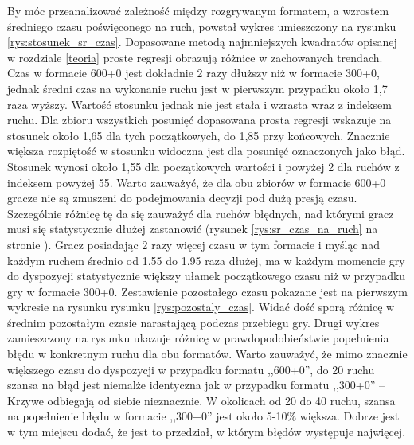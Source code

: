 \documentclass[inzynierska]{pwr_wmat_praca_dyplomowa}
\theoremstyle{plain}
\numberwithin{theorem}{chapter}
\theoremstyle{definition}
\numberwithin{theorem}{chapter}
\begin{document}
By móc przeanalizować zależność między rozgrywanym formatem, a wzrostem średniego czasu poświęconego na ruch, powstał wykres umieszczony na rysunku \ref{rys:stosunek_sr_czas}. Dopasowane metodą najmniejszych kwadratów opisanej w rozdziale \ref{teoria} proste regresji obrazują różnice w zachowanych trendach. Czas w formacie 600+0 jest dokładnie 2 razy dłuższy niż w formacie 300+0, jednak średni czas na wykonanie ruchu jest w pierwszym przypadku około 1,7 raza wyższy. Wartość stosunku jednak nie jest stała i wzrasta wraz z indeksem ruchu. Dla zbioru wszystkich posunięć dopasowana prosta regresji wskazuje na stosunek około 1,65 dla tych początkowych, do 1,85 przy końcowych. Znacznie większa rozpiętość w stosunku widoczna jest dla posunięć oznaczonych jako błąd. Stosunek wynosi około 1,55 dla początkowych wartości i powyżej 2 dla ruchów z indeksem powyżej 55. Warto zauważyć, że dla obu zbiorów w formacie 600+0 gracze nie są zmuszeni do podejmowania decyzji pod dużą presją czasu. Szczególnie różnicę tę da się zauważyć dla ruchów błędnych, nad którymi gracz musi się statystycznie dłużej zastanowić (rysunek \ref{rys:sr_czas_na_ruch} na stronie \pageref{rys:sr_czas_na_ruch}). Gracz posiadając 2 razy więcej czasu w tym formacie i myśląc nad każdym ruchem średnio od 1.55 do 1.95 raza dłużej,  ma w każdym momencie gry do dyspozycji statystycznie większy ułamek początkowego czasu niż w przypadku gry w formacie 300+0. Zestawienie pozostałego czasu pokazane jest na pierwszym wykresie na rysunku rysunku \ref{rys:pozostaly_czas}. Widać dość sporą różnicę w średnim pozostałym czasie narastającą podczas przebiegu gry. Drugi wykres zamieszczony na rysunku ukazuje różnicę w prawdopodobieństwie popełnienia błędu w konkretnym ruchu dla obu formatów. Warto zauważyć, że mimo znacznie większego czasu do dyspozycji w przypadku formatu ,,600+0'', do 20 ruchu szansa na błąd jest niemalże identyczna jak w przypadku formatu ,,300+0'' -- Krzywe odbiegają od siebie nieznacznie. W okolicach od 20 do 40 ruchu, szansa na popełnienie błędu w formacie ,,300+0'' jest około 5-10\% większa. Dobrze jest w tym miejscu dodać, że jest to przedział, w którym błędów występuje najwięcej.
\end{document}
